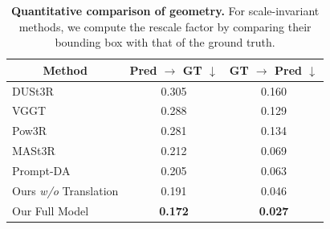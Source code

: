 

\begin{table}[t!]
\small
\centering
\begin{tabular}{l|cc}
\toprule

\multicolumn{1}{c}{\multirow{1}[0]{*}{Method}} & Pred $\rightarrow$ GT $\downarrow$ & GT $\rightarrow$ Pred $\downarrow$ \\ \midrule

DUSt3R         & 0.305 & 0.160 \\
VGGT           & 0.288 & 0.129 \\
Pow3R          & 0.281 & 0.134 \\
MASt3R         & 0.212 & 0.069 \\
Prompt-DA      & 0.205 & 0.063 \\
\hline 
Ours \textit{w/o} Translation   & 0.191 &  0.046 \\
Our Full Model   & \textbf{0.172}  & \textbf{0.027}  \\

\bottomrule
\end{tabular}
\vspace{-2mm}
\caption{\textbf{Quantitative comparison of geometry.} For scale-invariant methods, we compute the rescale factor by comparing their bounding box with that of the ground truth.}
\vspace{-4mm}
\label{tab:geometry}
\end{table}
